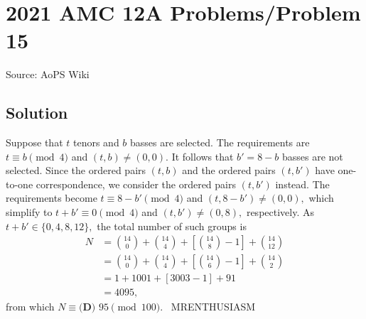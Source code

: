 \documentclass[12pt]{article}
\begin{document}
\section*{{2021 AMC 12A Problems/Problem 15}}
Source: AoPS Wiki

\subsection*{Solution}
Suppose that $t$ tenors and $b$ basses are selected. The requirements are $t\equiv b\pmod{4}$ and $(t,b)\neq(0,0).$ It follows that $b'=8-b$ basses are not selected. Since the ordered pairs $(t,b)$ and the ordered pairs $(t,b')$ have one-to-one correspondence, we consider the ordered pairs $(t,b')$ instead. The requirements become $t\equiv8-b'\pmod{4}$ and $(t,8-b')\neq(0,0),$ which simplify to $t+b'\equiv0\pmod{4}$ and $(t,b')\neq(0,8),$ respectively. As $t+b'\in\{0,4,8,12\},$ the total number of such groups is \begin{align*} N&=\binom{14}{0}+\binom{14}{4}+\left[\binom{14}{8}-1\right]+\binom{14}{12} \\ &=\binom{14}{0}+\binom{14}{4}+\left[\binom{14}{6}-1\right]+\binom{14}{2} \\ &=1+1001+[3003-1]+91 \\ &=4095, \end{align*} from which $N\equiv\boxed{\textbf{(D) } 95}\pmod{100}.$ ~MRENTHUSIASM
\end{document}
